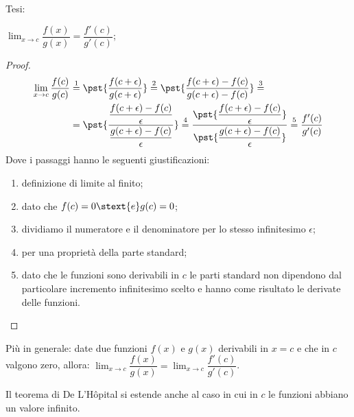 \noindent Tesi: 

\(\displaystyle \lim_{x \to c}\dfrac{f(x)}{g(x)} = 
  \dfrac{f'(c)}{g'(c)}\); 

\begin{proof}
\begin{align*}
\lim_{x \to c} \dfrac{f(c)}{g(c)} &\stackrel{1}{=}
\pst{\dfrac{f(c+\epsilon)}{g(c+\epsilon)}}\stackrel{2}{=}
\pst{\dfrac{f(c+\epsilon) - f(c)}{g(c+\epsilon) - f(c)}}\stackrel{3}{=} \\
&=\pst{\dfrac{\dfrac{f(c+\epsilon) - f(c)}{\epsilon}}
             {\dfrac{g(c+\epsilon) - f(c)}{\epsilon}}}\stackrel{4}{=}
\dfrac{\pst{\dfrac{f(c+\epsilon) - f(c)}{\epsilon}}}
        {\pst{\dfrac{g(c+\epsilon) - f(c)}{\epsilon}}}\stackrel{5}{=} 
\dfrac{f'(c)}{g'(c)}
\end{align*}
Dove i passaggi hanno le seguenti giustificazioni:
\begin{enumerate} [nosep]
\item definizione di limite al finito;
\item dato che \(f(c) = 0 \stext{e} g(c) = 0\);
\item dividiamo il numeratore e il denominatore per lo stesso infinitesimo 
\(\epsilon\);
\item per una proprietà della parte standard;
\item dato che le funzioni sono derivabili in \(c\) le parti 
standard non dipendono dal particolare incremento infinitesimo scelto e 
hanno come risultato le derivate delle funzioni.
\end{enumerate}
\end{proof}

Più in generale: 
date due funzioni \(f(x)\) e \(g(x)\) derivabili in \(x = c\) 
e che in \(c\) valgono zero, allora: \quad 
\(\displaystyle \lim_{x \to c} \dfrac{f(x)}{g(x)} = 
  \lim_{x \to c} \dfrac{f'(c)}{g'(c)}\).

\bigskip
Il teorema di De L'H\^opital si estende anche al caso in cui in \(c\) le 
funzioni abbiano un valore infinito.

% 








